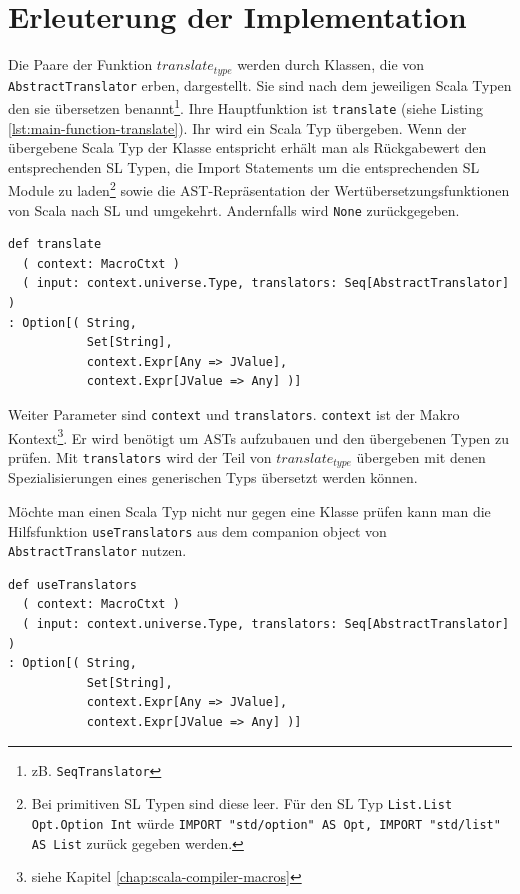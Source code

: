 \documentclass[12pt]{scrreprt}
\begin{document}

\section{Erleuterung der Implementation}
\label{sec:trans-implementation}

Die Paare der Funktion $translate_{type}$ werden durch Klassen, die von \lstinline!AbstractTranslator! erben, dargestellt. Sie sind nach dem jeweiligen Scala Typen den sie übersetzen benannt\footnote{zB. \lstinline!SeqTranslator!}. Ihre Hauptfunktion ist \lstinline!translate! (siehe Listing \ref{lst:main-function-translate}). Ihr wird ein Scala Typ übergeben. Wenn der übergebene Scala Typ der Klasse entspricht erhält man als Rückgabewert den entsprechenden \ac{SL} Typen, die Import Statements um die entsprechenden \ac{SL} Module zu laden\footnote{Bei primitiven \ac{SL} Typen sind diese leer. Für den \ac{SL} Typ \lstinline!List.List Opt.Option Int! würde \lstinline!IMPORT "std/option" AS Opt, IMPORT "std/list" AS List! zurück gegeben werden.} sowie die \ac{AST}-Repräsentation der Wertübersetzungsfunktionen von Scala nach \ac{SL} und umgekehrt. Andernfalls wird \lstinline!None! zurückgegeben.

\begin{lstlisting}[caption=Hauptfunktion in AbstractTranslator, label=lst:main-function-translate]
def translate
  ( context: MacroCtxt )
  ( input: context.universe.Type, translators: Seq[AbstractTranslator] )
: Option[( String, 
           Set[String], 
           context.Expr[Any => JValue], 
           context.Expr[JValue => Any] )]
\end{lstlisting}

Weiter Parameter sind \lstinline!context! und \lstinline!translators!. \lstinline!context! ist der Makro Kontext\footnote{siehe Kapitel \ref{chap:scala-compiler-macros}}. Er wird benötigt um \ac{AST}s aufzubauen und den übergebenen Typen zu prüfen. Mit \lstinline!translators! wird der Teil von $translate_{type}$ übergeben mit denen Spezialisierungen eines generischen Typs übersetzt werden können.

Möchte man einen Scala Typ nicht nur gegen eine Klasse prüfen kann man die Hilfsfunktion \lstinline!useTranslators! aus dem companion object von \lstinline!AbstractTranslator! nutzen.


\begin{lstlisting}[caption=Statische Hilfsfunktion in AbstractTranslator, label=lst:hilfsfunktionen]
def useTranslators
  ( context: MacroCtxt )
  ( input: context.universe.Type, translators: Seq[AbstractTranslator] )
: Option[( String,
           Set[String], 
           context.Expr[Any => JValue], 
           context.Expr[JValue => Any] )]
\end{lstlisting}
\end{document}
